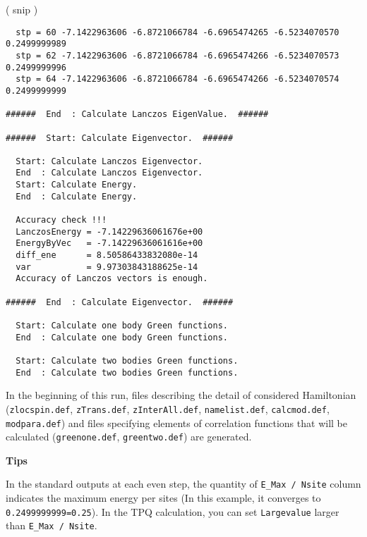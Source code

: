 \normalsize
( snip )
\small
\begin{verbatim}
  stp = 60 -7.1422963606 -6.8721066784 -6.6965474265 -6.5234070570 0.2499999989 
  stp = 62 -7.1422963606 -6.8721066784 -6.6965474266 -6.5234070573 0.2499999996 
  stp = 64 -7.1422963606 -6.8721066784 -6.6965474266 -6.5234070574 0.2499999999 

######  End  : Calculate Lanczos EigenValue.  ######

######  Start: Calculate Eigenvector.  ######

  Start: Calculate Lanczos Eigenvector.
  End  : Calculate Lanczos Eigenvector.
  Start: Calculate Energy.
  End  : Calculate Energy.

  Accuracy check !!!
  LanczosEnergy = -7.14229636061676e+00 
  EnergyByVec   = -7.14229636061616e+00 
  diff_ene      = 8.50586433832080e-14 
  var           = 9.97303843188625e-14 
  Accuracy of Lanczos vectors is enough.

######  End  : Calculate Eigenvector.  ######

  Start: Calculate one body Green functions.
  End  : Calculate one body Green functions.

  Start: Calculate two bodies Green functions.
  End  : Calculate two bodies Green functions.
\end{verbatim}
\normalsize

In the beginning of this run,
files describing the detail of considered Hamiltonian 
(\verb|zlocspin.def|, \verb|zTrans.def|, \verb|zInterAll.def|, 
\verb|namelist.def|, \verb|calcmod.def|, \verb|modpara.def|)
and files specifying elements of correlation functions
that will be calculated
(\verb|greenone.def|, \verb|greentwo.def|)
are generated.

\begin{screen}
\Large 
{\bf Tips}
\normalsize

In the standard outputs at each even step, 
the quantity of \verb|E_Max / Nsite| column indicates 
the maximum energy per sites
(In this example, it converges to \verb|0.2499999999=0.25|).
In the TPQ calculation, you can set \verb|Largevalue| %
larger than \verb|E_Max / Nsite|.

\end{screen}

